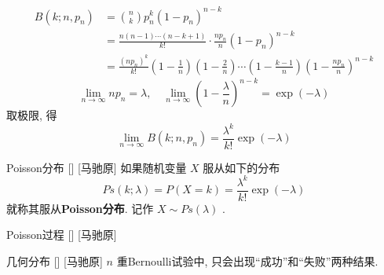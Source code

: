 \documentclass[UTF8]{ctexart}
\begin{document}
        \begin{prf}
            \[
                \begin{aligned}
                    B(k;n,p_n) &= \binom{n}{k}p_n^k(1-p_n)^{n-k}\\
                    &=\frac{n(n-1)\cdots(n-k+1)}{k!}\cdot\frac{np_n}{n}\left(1-p_n \right)^{n-k}\\
                    &=\frac{(np_n)^k}{k!}\left(1-\frac{1}{n} \right)\left(1-\frac{2}{n} \right)\cdots\left(1-\frac{k-1}{n} \right)\left(1-\frac{np_n}{n} \right)^{n-k}        
                \end{aligned}
            \]
            \[\lim_{n\to\infty}np_n=\lambda,\quad\lim_{n\to\infty}\left(1-\frac{\lambda}{n} \right)^{n-k}=\exp(-\lambda) \]
            取极限, 得\[\lim_{n\to\infty} B(k;n,p_n)=\frac{\lambda^k}{k!}\exp (-\lambda) \]
        \end{prf}

        \begin{dfn}
            []
            {Poisson分布}
            []
            [马驰原]
            如果随机变量 \(X\) 服从如下的分布\[Ps(k;\lambda)=P(X=k)=\frac{\lambda^k}{k!}\exp (-\lambda)\]就称其服从\textbf{Poisson分布}. 记作 \(X\sim Ps(\lambda)\) .
        \end{dfn}

        \begin{dfn}
            []
            {Poisson过程}
            []
            [马驰原]
        \end{dfn}

        \begin{dfn}
            []
            {几何分布}
            []
            [马驰原]
             \(n\) 重Bernoulli试验中, 只会出现“成功”和“失败”两种结果. 
        \end{dfn}
\end{document}
